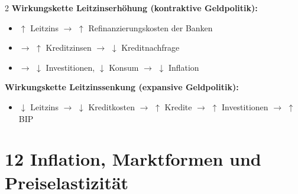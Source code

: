 \documentclass[10pt,a4paper]{article}
\begin{document}
\begin{multicols}{2}
\vspace{4pt}
\textbf{Wirkungskette Leitzinserhöhung (kontraktive Geldpolitik):}
\begin{itemize}[noitemsep, leftmargin=*]
  \item $\uparrow$ Leitzins $\to$ $\uparrow$ Refinanzierungskosten der Banken
  \item $\to$ $\uparrow$ Kreditzinsen $\to$ $\downarrow$ Kreditnachfrage
  \item $\to$ $\downarrow$ Investitionen, $\downarrow$ Konsum $\to$ $\downarrow$ Inflation
\end{itemize}

\textbf{Wirkungskette Leitzinssenkung (expansive Geldpolitik):}
\begin{itemize}[noitemsep, leftmargin=*]
  \item $\downarrow$ Leitzins $\to$ $\downarrow$ Kreditkosten $\to$ $\uparrow$ Kredite $\to$ $\uparrow$ Investitionen $\to$ $\uparrow$ BIP
\end{itemize}

\end{multicols}

\newpage

\section{12 \quad Inflation, Marktformen und Preiselastizität}
\end{document}
